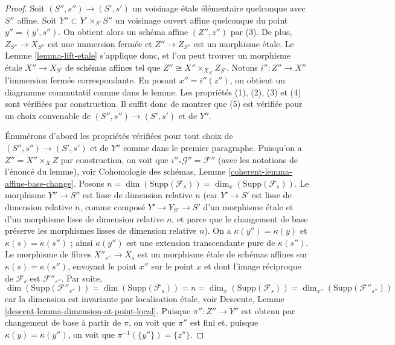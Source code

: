 \begin{proof}
Soit $(S'', s'') \to (S', s')$ un voisinage \'etale élémentaire quelconque
avec $S''$ affine. Soit $Y'' \subset Y' \times_{S'} S''$ un voisinage
ouvert affine quelconque du point $y'' = (y', s'')$. On
obtient alors un schéma affine $(Z'', z'')$ par (3). De plus, $Z_{S''} \to X_{S''}$
est une immersion fermée et $Z'' \to Z_{S''}$ est un morphisme \'etale.
Le
Lemme \ref{lemma-lift-etale}
s'applique donc, et l'on peut trouver un morphisme \'etale $X'' \to X_{S'}$ de schémas affines
tel que $Z'' \cong X'' \times_{X_{S'}} Z_{S'}$. Notons $i'' : Z'' \to X''$
l'immersion fermée correspondante. En posant $x'' = i''(z'')$, on obtient un
diagramme commutatif comme dans le lemme.
Les propriétés (1), (2), (3) et (4) sont vérifiées par construction.
Il suffit donc de montrer que (5) est vérifiée pour un choix convenable de
$(S'', s'') \to (S', s')$ et de $Y''$.

\medskip\noindent
Énumérons d'abord les propriétés vérifiées pour tout choix de
$(S'', s'') \to (S', s')$ et de $Y''$ comme dans le premier paragraphe.
Puisqu'on a $Z'' = X'' \times_X Z$ par construction, on voit que
$i''_*\mathcal{G}'' = \mathcal{F}''$ (avec les notations de
l'énoncé du lemme), voir
Cohomologie des schémas, Lemme \ref{coherent-lemma-affine-base-change}.
Posons $n = \dim(\text{Supp}(\mathcal{F}_s)) = \dim_x(\text{Supp}(\mathcal{F}_s))$.
Le morphisme $Y'' \to S''$ est lisse de dimension relative $n$
(car $Y' \to S'$ est lisse de dimension relative $n$,
comme composé $Y' \to Y_{S'} \to S'$ d'un morphisme \'etale et
d'un morphisme lisse de dimension relative $n$, et parce que le changement de base
préserve les morphismes lisses de dimension relative $n$).
On a $\kappa(y'') = \kappa(y)$ et $\kappa(s) = \kappa(s'')$ ;
ainsi $\kappa(y'')$ est une extension transcendante pure de $\kappa(s'')$.
Le morphisme de fibres $X''_{s''} \to X_s$ est un morphisme \'etale de schémas
affines sur $\kappa(s) = \kappa(s'')$, envoyant le point $x''$ sur le
point $x$ et dont l'image réciproque de $\mathcal{F}_s$ est $\mathcal{F}''_{s''}$.
Par suite,
$$
\dim(\text{Supp}(\mathcal{F}''_{s''})) =
\dim(\text{Supp}(\mathcal{F}_s)) = n =
\dim_x(\text{Supp}(\mathcal{F}_s)) =
\dim_{x''}(\text{Supp}(\mathcal{F}''_{s''}))
$$
car la dimension est invariante par localisation \'etale, voir
Descente, Lemme \ref{descent-lemma-dimension-at-point-local}.
Puisque $\pi'' : Z'' \to Y''$ est obtenu par changement de base à partir de $\pi$, on voit que
$\pi''$ est fini et, puisque $\kappa(y) = \kappa(y'')$, on voit que
$\pi^{-1}(\{y''\}) = \{z''\}$.


\end{proof}
